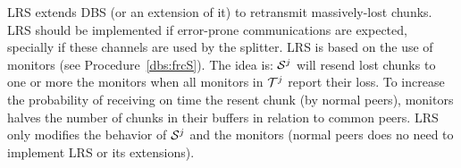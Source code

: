 LRS extends DBS (or an extension of it) to retransmit massively-lost
chunks. LRS should be implemented if error-prone communications are
expected, specially if these channels are used by the splitter. LRS is
based on the use of monitors (see Procedure~\ref{dbs:frcS}). The idea
is: ${\cal S}^j$ will resend lost chunks to one or more the monitors
when all monitors in ${\cal T}^j$ report their loss. To increase the
probability of receiving on time the resent chunk (by normal peers),
monitors halves the number of chunks in their buffers in relation to
common peers. LRS only modifies the behavior of ${\cal S}^j$ and the
monitors (normal peers does no need to implement LRS or its
extensions).

\begin{comment}
LRS should be used when it is expected to have loss-prone
communication links or when the bit-rate of the stream exceeds the
uploading capacity of the nodes. Notice that the impact of using LSR
for normal peers is null.

P2PSP relies in UDP to transmit the chunks, and obviously, packet
losses can happen. The impact of a packet loss in the QoS provided
depends on where the packets are lost and who lost it. If a packet is
lost in its trip between the splitter and a peer, this packet will be
missed by all the team.

\subsubsection{Monitor peers}
The overlay administrator can create some special peers called, in
short,\emph{monitors}. These peers are introduced to the rest of peers
of the team as normal peers and behave like the rest of well-intended
peers, churn included. Monitor peers can be asked by the splitter to
check whether the operation of the team has and is been correct.

\subsubsection{Selfish peers rejection}
Another functionality of monitors is to tell the splitter which chunks
have not been received on time (the consequence of receiving a lost
too late is the same than not receiving it never). The splitter
memorizes which chunk has been sent to each peer in the current
round. If all monitors reports that a chunk has been lost, the
splitter can determine which peer has been in charge of broadcasting
that chunk and take note of this. If this problem happens a given
number of times, the splitter can expell the unreliable peer from the
team by stop sending to it futher chunks.


\end{comment}

